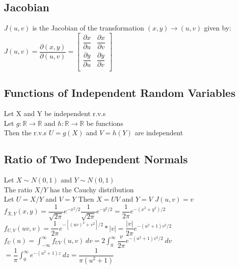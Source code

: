 \documentclass{article}
\begin{document}
\begin{flushleft}
\subsection*{Jacobian}
$J(u,v)$ is the Jacobian of the transformation $(x,y)\to (u,v)$ given by:\medbreak
$J(u,v)=\dfrac{\partial(x,y)}{\partial(u,v)}=
\begin{bmatrix}
\dfrac{\partial x}{\partial u}& \dfrac{\partial x}{\partial v}\\
\dfrac{\partial y}{\partial u}& \dfrac{\partial y}{\partial v}\\
\end{bmatrix}$
\subsection*{Functions of Independent Random Variables}
Let X and Y be independent r.v.s\\
Let $g:\mathbb{R}\to \mathbb{R}$ and $h:\mathbb{R}\to \mathbb{R}$ be functions\\
Then the r.v.s $U=g(X)$ and $V=h(Y)$ are independent
\subsection*{Ratio of Two Independent Normals}
Let $X \sim N(0,1)$ and $Y\sim N(0,1)$\\
The ratio $X/Y$ has the Cauchy distribution\\
Let $U=X/Y$ and $V=Y$ \quad Then $X=UV$ and $Y=V$ \quad $J(u,v)=v$\\
$f_{X,Y}(x,y)=\dfrac{1}{\sqrt{2\pi}}e^{-x^2/2}\dfrac{1}{\sqrt{2\pi}}e^{-y^2/2}=\dfrac{1}{2\pi}e^{-(x^2+y^2)/2}$\\
$f_{U,V}(uv,v)=\dfrac{1}{2\pi}e^{-[(uv)^2+v^2]/2}*|v|=\dfrac{|v|}{2\pi}e^{-(u^2+1)v^2/2}$\\
$f_{U}(u)=\int_{-\infty}^{\infty}f_{UV}(u,v) \ dv=2\int_{0}^{\infty}\dfrac{v}{2\pi}e^{-(u^2+1)v^2/2} \ dv$\\
$=\dfrac{1}{\pi}\int_{0}^{\infty}e^{-(u^2+1)z} \ dz=\dfrac{1}{\pi(u^2+1)}$

\end{flushleft}
\end{document}
